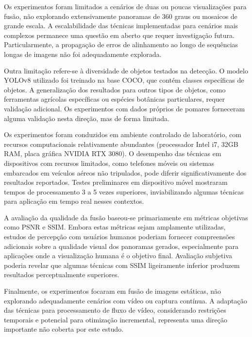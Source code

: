 Os experimentos foram limitados a cenários de duas ou poucas visualizações para fusão, não explorando extensivamente panoramas de 360 graus ou mosaicos de grande escala. A escalabilidade das técnicas implementadas para cenários mais complexos permanece uma questão em aberto que requer investigação futura. Particularmente, a propagação de erros de alinhamento ao longo de sequências longas de imagens não foi adequadamente explorada.

Outra limitação refere-se à diversidade de objetos testados na detecção. O modelo YOLOv8 utilizado foi treinado na base COCO, que contém classes específicas de objetos. A generalização dos resultados para outros tipos de objetos, como ferramentas agrícolas específicas ou espécies botânicas particulares, requer validação adicional. Os experimentos com dados próprios de pomares forneceram alguma validação nesta direção, mas de forma limitada.

Os experimentos foram conduzidos em ambiente controlado de laboratório, com recursos computacionais relativamente abundantes (processador Intel i7, 32GB RAM, placa gráfica NVIDIA RTX 3080). O desempenho das técnicas em dispositivos com recursos limitados, como telefones móveis ou sistemas embarcados em veículos aéreos não tripulados, pode diferir significativamente dos resultados reportados. Testes preliminares em dispositivo móvel mostraram tempos de processamento 3 a 5 vezes superiores, inviabilizando algumas técnicas para aplicação em tempo real nesses contextos.

A avaliação da qualidade da fusão baseou-se primariamente em métricas objetivas como PSNR e SSIM. Embora estas métricas sejam amplamente utilizadas, estudos de percepção com usuários humanos poderiam fornecer compreensões adicionais sobre a qualidade visual dos panoramas gerados, especialmente para aplicações onde a visualização humana é o objetivo final. Avaliação subjetiva poderia revelar que algumas técnicas com SSIM ligeiramente inferior produzem resultados perceptualmente superiores.

Finalmente, os experimentos focaram em fusão de imagens estáticas, não explorando adequadamente cenários com vídeo ou captura contínua. A adaptação das técnicas para processamento de fluxo de vídeo, considerando restrições temporais e potencial para otimização incremental, representa uma direção importante não coberta por este estudo.



